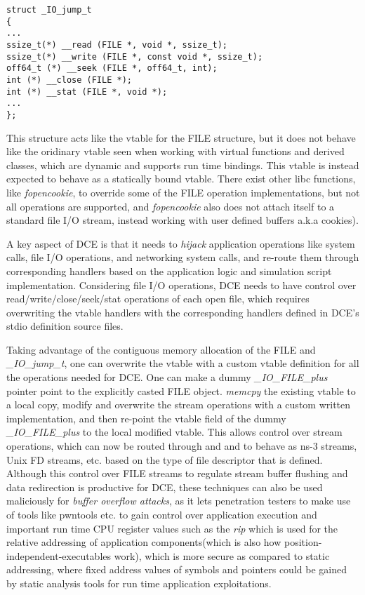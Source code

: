 \documentclass{sig-alternate}
\begin{document}
\begin{lstlisting}[style=CStyle]     
struct _IO_jump_t
{
...
ssize_t(*) __read (FILE *, void *, ssize_t);
ssize_t(*) __write (FILE *, const void *, ssize_t);
off64_t (*) __seek (FILE *, off64_t, int);
int (*) __close (FILE *);
int (*) __stat (FILE *, void *);
...
};
\end{lstlisting}

This structure acts like the vtable for the FILE structure, but it does not behave like the oridinary vtable seen when working with virtual functions 
and derived classes, which are dynamic and supports run time bindings. This vtable is instead expected to behave as a statically bound vtable.  There exist 
other libc functions, like \textit{fopencookie}, to override some of the FILE operation implementations, but not all operations are supported, and 
\textit{fopencookie} also does not attach itself to a standard file I/O stream, 
instead working with user defined buffers a.k.a cookies). 

A key aspect of DCE is that it needs to \textit{hijack}
application operations like system calls, file I/O operations, and networking
system calls, and re-route them through 
corresponding handlers based on the application logic and simulation script implementation. Considering file I/O operations, DCE needs to have control 
over read/write/close/seek/stat operations of each open file, which requires
overwriting the vtable handlers with the corresponding handlers defined 
in DCE's stdio definition source files. 

Taking advantage of the contiguous memory allocation of the FILE and \textit{\_IO\_jump\_t}, one can overwrite the vtable with a custom vtable definition for all the operations needed for DCE. One can make a dummy \textit{\_IO\_FILE\_plus} 
pointer point to the explicitly casted FILE object. \textit{memcpy} the existing vtable to a local copy, modify and overwrite the stream operations with a 
custom written implementation, and then re-point the vtable field of the dummy \textit{\_IO\_FILE\_plus} to the local modified vtable.  This allows
control over stream operations, which can now be routed through and and to behave as ns-3 streams, Unix FD streams, etc. based on the type of file 
descriptor that is defined.  Although this control over FILE streams
to regulate stream buffer flushing and data redirection is productive for
DCE, these techniques can also be used maliciously for
\textit{buffer overflow attacks}, as it lets penetration 
testers to make use of tools like pwntools etc. to gain control over application execution and important run time CPU register values such as the 
\textit{rip} which is used for the relative addressing of application components(which is also how position-independent-executables work), which is more 
secure as compared to static addressing, where fixed address values of symbols and pointers could be gained by static analysis tools for run 
time application exploitations.
\end{document}
